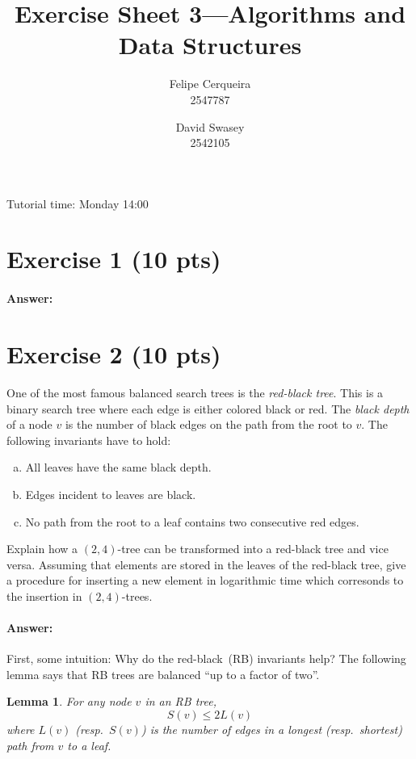 \documentclass[a4paper]{article}
\title{Exercise Sheet 3---Algorithms and Data Structures}
\author{Felipe Cerqueira \\ 2547787 \and David Swasey \\ 2542105}
\newtheorem{mylemma}{\textbf{Lemma}}
\begin{document}
\maketitle

Tutorial time: Monday 14:00

\section{Exercise 1 (10 pts)}

\paragraph{Answer:}

\section{Exercise 2 (10 pts)}

One of the most famous balanced search trees is the \emph{red-black tree}.
This is a binary search tree where each edge is either colored black or red.
The \emph{black depth} of a node $v$ is the number of black edges on the path from the root to $v$.
The following invariants have to hold:
\begin{enumerate}[a)]
\item All leaves have the same black depth.
\item Edges incident to leaves are black.
\item No path from the root to a leaf contains two consecutive red edges.
\end{enumerate}

Explain how a $(2,4)$-tree can be transformed into a red-black tree and vice versa.
Assuming that elements are stored in the leaves of the red-black tree, give a procedure for inserting a new element in logarithmic time which corresonds to the insertion in $(2,4)$-trees.

\paragraph{Answer:}

First, some intuition:
Why do the red-black~(RB) invariants help?
The following lemma says that RB trees are balanced ``up to a factor of two''.

\begin{mylemma}
	For any node $v$ in an RB tree,
	\[
		S(v) \le 2L(v)
	\]
	where $L(v)$ (resp.\ $S(v)$) is the number of edges in a longest (resp.\ shortest) path from $v$ to a leaf.
\end{mylemma}
\end{document}
